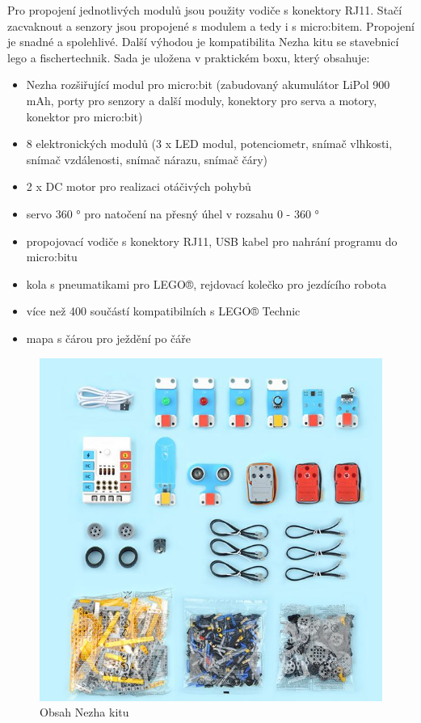 \documentclass[
  digital,     %
  oneside,     %
  nosansbold,  %
  colorbold, %
  lof,         %
  nolot,         %
]{fithesis4}
\begin{document}
Pro propojení jednotlivých modulů jsou použity vodiče s konektory RJ11. Stačí zacvaknout a senzory jsou propojené s modulem a tedy i s micro:bitem. Propojení je snadné a spolehlivé. Další výhodou je kompatibilita Nezha kitu se stavebnicí lego a fischertechnik. Sada je uložena v praktickém boxu, který obsahuje:
\begin{itemize}
    \item Nezha rozšiřující modul pro micro:bit (zabudovaný akumulátor LiPol 900 mAh, porty pro senzory a další moduly, konektory pro serva a motory, konektor pro micro:bit)
    \item 8 elektronických modulů (3 x LED modul, potenciometr, snímač vlhkosti, snímač vzdálenosti, snímač nárazu, snímač čáry)
    \item 2 x DC motor pro realizaci otáčivých pohybů
    \item servo 360 ° pro natočení na přesný úhel v rozsahu 0 - 360 °
    \item propojovací vodiče s konektory RJ11, USB kabel pro nahrání programu do micro:bitu
    \item kola s pneumatikami pro LEGO®, rejdovací kolečko pro jezdícího robota
    \item více než 400 součástí kompatibilních s LEGO® Technic
    \item mapa s čárou pro ježdění po čáře
\end{itemize}

\begin{figure}[ht]
    \centering
    \includegraphics[width=\textwidth] {images/nezhaKit.jpg}
    \caption{Obsah Nezha kitu \cite{nezhasSet}}
    \label{nezhakit}
\end{figure}
\end{document}
